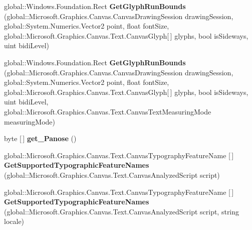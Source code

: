 \begin{DoxyCompactItemize}
global\+::\+Windows.\+Foundation.\+Rect {\bfseries Get\+Glyph\+Run\+Bounds} (global\+::\+Microsoft.\+Graphics.\+Canvas.\+Canvas\+Drawing\+Session drawing\+Session, global\+::\+System.\+Numerics.\+Vector2 point, float font\+Size, global\+::\+Microsoft.\+Graphics.\+Canvas.\+Text.\+Canvas\+Glyph\mbox{[}$\,$\mbox{]} glyphs, bool is\+Sideways, uint bidi\+Level)
\item 
\mbox{\label{interface_microsoft_1_1_graphics_1_1_canvas_1_1_text_1_1_i_canvas_font_face_ab4bcc736bd64c389afff43dc59261d7a}} 
global\+::\+Windows.\+Foundation.\+Rect {\bfseries Get\+Glyph\+Run\+Bounds} (global\+::\+Microsoft.\+Graphics.\+Canvas.\+Canvas\+Drawing\+Session drawing\+Session, global\+::\+System.\+Numerics.\+Vector2 point, float font\+Size, global\+::\+Microsoft.\+Graphics.\+Canvas.\+Text.\+Canvas\+Glyph\mbox{[}$\,$\mbox{]} glyphs, bool is\+Sideways, uint bidi\+Level, global\+::\+Microsoft.\+Graphics.\+Canvas.\+Text.\+Canvas\+Text\+Measuring\+Mode measuring\+Mode)
\item 
\mbox{\label{interface_microsoft_1_1_graphics_1_1_canvas_1_1_text_1_1_i_canvas_font_face_ac7be86dad891579aead7f004b66c982b}} 
byte \mbox{[}$\,$\mbox{]} {\bfseries get\+\_\+\+Panose} ()
\item 
\mbox{\label{interface_microsoft_1_1_graphics_1_1_canvas_1_1_text_1_1_i_canvas_font_face_a01f36f433afb1083c97290d046937f8d}} 
global\+::\+Microsoft.\+Graphics.\+Canvas.\+Text.\+Canvas\+Typography\+Feature\+Name \mbox{[}$\,$\mbox{]} {\bfseries Get\+Supported\+Typographic\+Feature\+Names} (global\+::\+Microsoft.\+Graphics.\+Canvas.\+Text.\+Canvas\+Analyzed\+Script script)
\item 
\mbox{\label{interface_microsoft_1_1_graphics_1_1_canvas_1_1_text_1_1_i_canvas_font_face_ab214ca68fc058daaf2086d1a25bb9ed0}} 
global\+::\+Microsoft.\+Graphics.\+Canvas.\+Text.\+Canvas\+Typography\+Feature\+Name \mbox{[}$\,$\mbox{]} {\bfseries Get\+Supported\+Typographic\+Feature\+Names} (global\+::\+Microsoft.\+Graphics.\+Canvas.\+Text.\+Canvas\+Analyzed\+Script script, string locale)
\item 

\end{DoxyCompactItemize}
